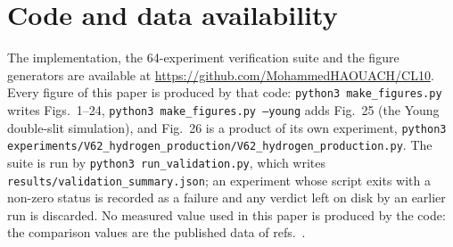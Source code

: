 \section*{Code and data availability}
The implementation, the 64-experiment verification suite and the figure
generators are available at \url{https://github.com/MohammedHAOUACH/CL10}.
Every figure of this paper is produced by that code:
\texttt{python3 make\_figures.py} writes Figs.~1--24,
\texttt{python3 make\_figures.py --young} adds Fig.~25 (the Young
double-slit simulation), and Fig.~26 is a product of its own experiment,
\texttt{python3 experiments/V62\_hydrogen\_production/V62\_hydrogen\_production.py}.
The suite is run by \texttt{python3 run\_validation.py}, which writes
\texttt{results/validation\_summary.json}; an experiment whose script exits
with a non-zero status is recorded as a failure and any verdict left on disk
by an earlier run is discarded. No measured value used in this paper is
produced by the code: the comparison values are the published data of
refs.~\cite{ref13,ref14,ref15,ref16,ref17}.
